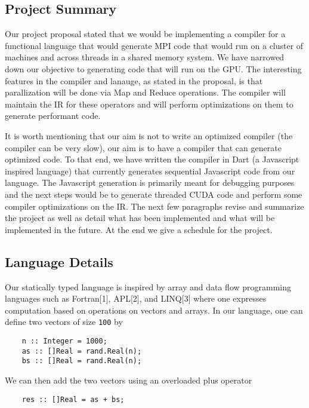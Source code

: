 \subsection{Project Summary}

Our project proposal stated that we would be implementing a compiler for
a functional language that would generate MPI code that would run on a
cluster of machines and across threads in a shared memory system. We
have narrowed down our objective to generating code that will run on the
GPU. The interesting features in the compiler and lanauge, as stated in
the proposal, is that parallization will be done via Map and Reduce
operations. The compiler will maintain the IR for these operators and
will perform optimizations on them to generate performant code.

It is worth mentioning that our aim is not to write an optimized
compiler (the compiler can be very slow), our aim is to have a compiler
that can generate optimized code. To that end, we have written the
compiler in Dart (a Javascript inspired language) that currently
generates sequential Javascript code from our language. The Javascript
generation is primarily meant for debugging purposes and the next steps
would be to generate threaded CUDA code and perform some compiler
optimizations on the IR. The next few paragraphs revise and summarize
the project as well as detail what has been implemented and what will be
implemented in the future. At the end we give a schedule for the
project.

\subsection{Language Details}

Our statically typed language is inspired by array and data flow
programming languages such as Fortran{[}1{]}, APL{[}2{]}, and
LINQ{[}3{]} where one expresses computation based on operations on
vectors and arrays. In our language, one can define two vectors of size
\texttt{100} by

\begin{verbatim}
    n :: Integer = 1000;
    as :: []Real = rand.Real(n);
    bs :: []Real = rand.Real(n); 
\end{verbatim}

We can then add the two vectors using an overloaded plus operator

\begin{verbatim}
    res :: []Real = as + bs;
\end{verbatim}

